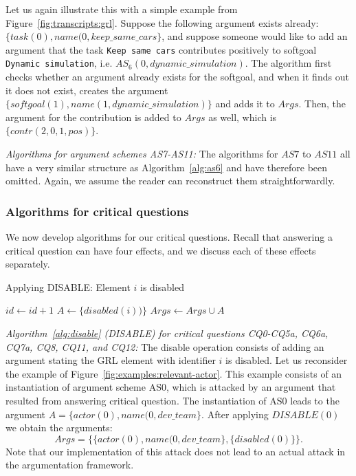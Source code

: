 Let us again illustrate this with a simple example from Figure~\ref{fig:transcripts:grl}. Suppose the following argument exists already: $\{task(0),name(0,keep\_same\_cars\}$, and suppose someone would like to add an argument that the task \texttt{Keep same cars} contributes positively to softgoal \texttt{Dynamic simulation}, i.e. $AS_6(0,dynamic\_simulation)$. The algorithm first checks whether an argument already exists for the softgoal, and when it finds out it does not exist, creates the argument $\{softgoal(1),name(1,dynamic\_simulation)\}$ and adds it to $Args$. Then, the argument for the contribution is added to $Args$ as well, which is $\{contr(2,0,1,pos)\}$.

\emph{Algorithms for argument schemes AS7-AS11:} The algorithms for $AS7$ to $AS11$ all have a very similar structure as Algorithm~\ref{alg:as6} and have therefore been omitted. Again, we assume the reader can reconstruct them straightforwardly.

\subsubsection*{Algorithms for critical questions}

We now develop algorithms for our critical questions. Recall that answering a critical question can have four effects, and we discuss each of these effects separately.

\begin{algorithm}[h]
  \caption{Applying DISABLE: Element $i$ is disabled}\label{alg:disable}
  \begin{algorithmic}[1]
    \State $id\gets id+1$
    \State $A\gets \{disabled(i))\}$
    \State $Args \gets Args\cup A$
    \EndProcedure
  \end{algorithmic}
\end{algorithm}

\emph{Algorithm~\ref{alg:disable} (\textsf{DISABLE}) for critical questions CQ0-CQ5a, CQ6a, CQ7a, CQ8, CQ11, and CQ12:} The disable operation consists of adding an argument stating the GRL element with identifier $i$ is disabled. Let us reconsider the example of Figure~\ref{fig:examples:relevant-actor}. This example consists of an instantiation of argument scheme AS0, which is attacked by an argument that resulted from answering critical question. The instantiation of AS0 leads to the argument $A=\{actor(0),name(0,dev\_team\}$. After applying $DISABLE(0)$ we obtain the arguments: $$Args=\{\{actor(0),name(0,dev\_team\}, \{disabled(0)\}\}.$$ Note that our implementation of this attack does not lead to an actual attack in the argumentation framework.

